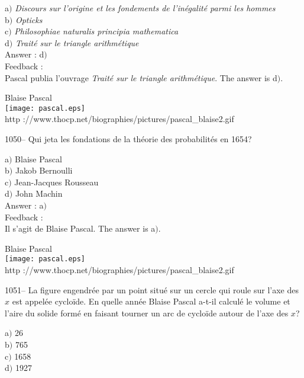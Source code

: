 \documentclass[letterpaper, 12pt]{article}
\begin{document}
a$)$ {\sl Discours sur l'origine et les fondements de l'in\'egalit\'e parmi
les hommes} \\
b$)$ {\sl Opticks}  \\
c$)$ {\sl Philosophiae naturalis principia mathematica}  \\
d$)$ {\sl Trait\'e sur le triangle arithm\'etique}\\

Answer : d$)$\\

Feedback : \\
Pascal publia l'ouvrage {\sl Trait\'e sur le triangle
arithm\'etique}.
The answer is d$)$.\\

        \begin{center}
        Blaise Pascal\\
    \texttt{[image: pascal.eps]}\\
        {\footnotesize http
://www.thocp.net/biographies/pictures/pascal\_blaise2.gif}
    \end{center}

1050-- Qui jeta les fondations de la th\'eorie des probabilit\'es en
1654?

a$)$ Blaise Pascal \\
b$)$ Jakob Bernoulli  \\
c$)$ Jean-Jacques Rousseau \\
d$)$ John Machin\\

Answer : a$)$\\

Feedback : \\
Il s'agit de Blaise Pascal.
The answer is a$)$.\\

        \begin{center}
        Blaise Pascal\\
    \texttt{[image: pascal.eps]}\\
        {\footnotesize http
://www.thocp.net/biographies/pictures/pascal\_blaise2.gif}
    \end{center}

1051-- La figure engendr\'ee par un point situ\'e sur un cercle qui
roule sur l'axe des $x$ est appel\'ee cyclo\"ide. En quelle ann\'ee
Blaise Pascal a-t-il calcul\'e le volume et l'aire du solide form\'e
en faisant tourner un arc de cyclo\"ide autour de l'axe des $x$?

a$)$ 26 \\
b$)$ 765  \\
c$)$ 1658  \\
d$)$ 1927\\
\end{document}
